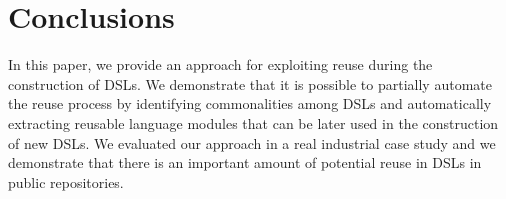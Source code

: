 \section{Conclusions}
\label{sec:conclusions}

In this paper, we provide an approach for exploiting reuse during the construction of DSLs. We demonstrate that it is possible to partially automate the reuse process by identifying commonalities among DSLs and automatically extracting reusable language modules that can be later used in the construction of new DSLs. We evaluated our approach in a real industrial case study and we demonstrate that there is an important amount of potential reuse in DSLs in public repositories.


